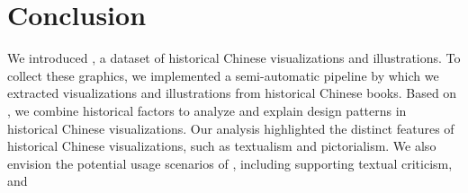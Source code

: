 \section{Conclusion}

We introduced \datasetName, a dataset of historical Chinese visualizations and illustrations.
To collect these graphics, we implemented a semi-automatic pipeline by which we extracted \numVisShort visualizations and \numIllusShort illustrations from historical Chinese books.
Based on \datasetName, we combine historical factors to analyze and explain design patterns in historical Chinese visualizations.
Our analysis highlighted the distinct features of historical Chinese visualizations, such as textualism and pictorialism.
We also envision the potential usage scenarios of \datasetName, including supporting textual criticism, and 

